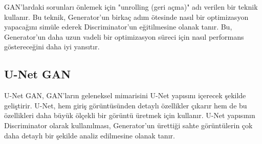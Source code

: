 GAN'lardaki sorunları önlemek için "unrolling (geri açma)" adı verilen bir teknik kullanır. Bu teknik, Generator'un birkaç adım ötesinde nasıl bir optimizasyon yapacağını simüle ederek Discriminator'un eğitilmesine olanak tanır. Bu, Generator'un daha uzun vadeli bir optimizasyon süreci için nasıl performans göstereceğini daha iyi yansıtır. 

\newpage

\subsection{U-Net GAN}

U-Net GAN, GAN’ların geleneksel mimarisini U-Net yapısını içerecek şekilde geliştirir. U-Net, hem giriş görüntüsünden detaylı özellikler çıkarır hem de bu özellikleri daha büyük ölçekli bir görüntü üretmek için kullanır. U-Net yapısının Discriminator olarak kullanılması, Generator'un ürettiği sahte görüntülerin çok daha detaylı bir şekilde analiz edilmesine olanak tanır.

\newpage